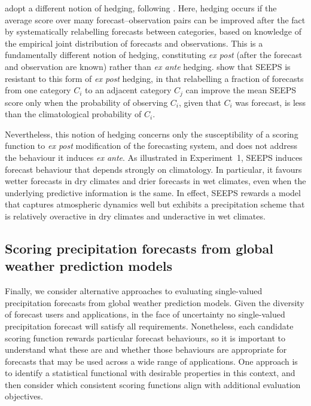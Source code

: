 \documentclass[10pt]{article} %
\theoremstyle{theorem}
\theoremstyle{definition}
\begin{document}
\citet{rodwell2010new} adopt a different notion of hedging, following \citet{stephenson2000use}. Here, hedging occurs if the average score over many forecast--observation pairs can be improved after the fact by systematically relabelling forecasts between categories, based on knowledge of the empirical joint distribution of forecasts and observations. This is a fundamentally different notion of hedging, constituting \textit{ex post} (after the forecast and observation are known) rather than \textit{ex ante} hedging. \citet{rodwell2010new} show that SEEPS is resistant to this form of \textit{ex post} hedging, in that relabelling a fraction of forecasts from one category $C_i$ to an adjacent category $C_j$ can improve the mean SEEPS score only when the probability of observing $C_i$, given that $C_i$ was forecast, is less than the climatological probability of $C_i$.

Nevertheless, this notion of hedging concerns only the susceptibility of a scoring function to \textit{ex post} modification of the forecasting system, and does not address the behaviour it induces \textit{ex ante}. As illustrated in Experiment~1, SEEPS induces forecast behaviour that depends strongly on climatology. In particular, it favours wetter forecasts in dry climates and drier forecasts in wet climates, even when the underlying predictive information is the same. In effect, SEEPS rewards a model that captures atmospheric dynamics well but exhibits a precipitation scheme that is relatively overactive in dry climates and underactive in wet climates.

\subsection{Scoring precipitation forecasts from global weather prediction models}\label{ss:alternatives}

Finally, we consider alternative approaches to evaluating single-valued precipitation forecasts from global weather prediction models. Given the diversity of forecast users and applications, in the face of uncertainty no single-valued precipitation forecast will satisfy all requirements. Nonetheless, each candidate scoring function rewards particular forecast behaviours, so it is important to understand what these are and whether those behaviours are appropriate for forecasts that may be used across a wide range of applications. One approach is to identify a statistical functional with desirable properties in this context, and then consider which consistent scoring functions  align with additional evaluation objectives.
\end{document}
